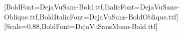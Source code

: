 \setmainfont{DejaVuSans.ttf}[BoldFont=DejaVuSans-Bold.ttf,ItalicFont=DejaVuSans-Oblique.ttf,BoldItalicFont=DejaVuSans-BoldOblique.ttf]
\setmonofont{DejaVuSansMono.ttf}[Scale=0.88,BoldFont=DejaVuSansMono-Bold.ttf]
\usepackage{xcolor}
\AtBeginDocument{\hypersetup{linkcolor=mhblue,urlcolor=mhblue}}
\setlength{\parskip}{0.45em}
